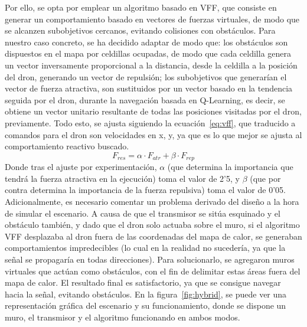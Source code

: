 Por ello, se opta por emplear un algoritmo basado en \ac{VFF}, que consiste en generar un comportamiento basado en vectores de fuerzas virtuales, de modo que se alcanzen subobjetivos cercanos, evitando colisiones con obstáculos. Para nuestro caso concreto, se ha decidido adaptar de modo que: los obstáculos son dispuestos en el mapa por celdillas ocupadas, de modo que cada celdilla genera un vector inversamente proporcional a la distancia, desde la celdilla a la posición del dron, generando un vector de repulsión; los subobjetivos que generarían el vector de fuerza atractiva, son sustituidos por un vector basado en la tendencia seguida por el dron, durante la navegación basada en Q-Learning, es decir, se obtiene un vector unitario resultante de todas las posiciones visitadas por el dron, previamente. Todo esto, se ajusta siguiendo la ecuación~\ref{eq:vff}, que traducido a comandos para el dron son velocidades en x, y, ya que es lo que mejor se ajusta al comportamiento reactivo buscado.
\begin{equation}
    F_{res} = \alpha \cdot F_{atr} + \beta \cdot F_{rep}
    \label{eq:vff}
\end{equation}
Donde tras el ajuste por experimentación, $\alpha$ (que determina la importancia que tendrá la fuerza atractiva en la ejecución) toma el valor de 2'5, y $\beta$ (que por contra determina la importancia de la fuerza repulsiva) toma el valor de 0'05. Adicionalmente, es necesario comentar un problema derivado del diseño a la hora de simular el escenario. A causa de que el transmisor se sitúa esquinado y el obstáculo también, y dado que el dron solo actuaba sobre el muro, si el algoritmo \ac{VFF} desplazaba al dron fuera de las coordenadas del mapa de calor, se generaban comportamientos impredecibles (lo cual en la realidad no sucedería, ya que la señal se propagaría en todas direcciones). Para solucionarlo, se agregaron muros virtuales que actúan como obstáculos, con el fin de delimitar estas áreas fuera del mapa de calor. El resultado final es satisfactorio, ya que se consigue navegar hacia la señal, evitando obstáculos. En la figura~\ref{fig:hybrid}, se puede ver una representación gráfica del escenario y su funcionamiento, donde se dispone un muro, el transmisor y el algoritmo funcionando en ambos modos.

